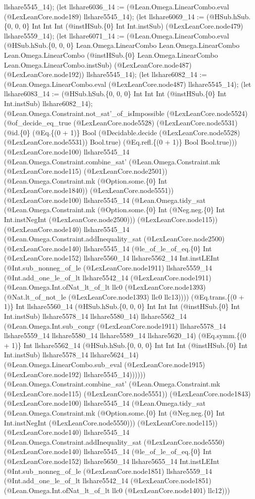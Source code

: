 \documentclass[11pt]{article}
\begin{document}
llshare5545\_14); (let llshare6036\_14 := (@Lean.Omega.LinearCombo.eval (@LexLeanCore.node189) llshare5545\_14); (let llshare6069\_14 := (@HSub.hSub.\{0, 0, 0\} Int Int Int (@instHSub.\{0\} Int Int.instSub) (@LexLeanCore.node479) llshare5559\_14); (let llshare6071\_14 := (@Lean.Omega.LinearCombo.eval (@HSub.hSub.\{0, 0, 0\} Lean.Omega.LinearCombo Lean.Omega.LinearCombo Lean.Omega.LinearCombo (@instHSub.\{0\} Lean.Omega.LinearCombo Lean.Omega.LinearCombo.instSub) (@LexLeanCore.node487) (@LexLeanCore.node192)) llshare5545\_14); (let llshare6082\_14 := (@Lean.Omega.LinearCombo.eval (@LexLeanCore.node487) llshare5545\_14); (let llshare6083\_14 := (@HSub.hSub.\{0, 0, 0\} Int Int Int (@instHSub.\{0\} Int Int.instSub) llshare6082\_14); (@Lean.Omega.Constraint.not\_sat'\_of\_isImpossible (@LexLeanCore.node5524) (@of\_decide\_eq\_true (@LexLeanCore.node5528) (@LexLeanCore.node5531) (@id.\{0\} (@Eq.\{(0 + 1)\} Bool (@Decidable.decide (@LexLeanCore.node5528) (@LexLeanCore.node5531)) Bool.true) (@Eq.refl.\{(0 + 1)\} Bool Bool.true))) (@LexLeanCore.node100) llshare5545\_14 (@Lean.Omega.Constraint.combine\_sat' (@Lean.Omega.Constraint.mk (@LexLeanCore.node115) (@LexLeanCore.node2501)) (@Lean.Omega.Constraint.mk (@Option.some.\{0\} Int (@LexLeanCore.node1840)) (@LexLeanCore.node5551)) (@LexLeanCore.node100) llshare5545\_14 (@Lean.Omega.tidy\_sat (@Lean.Omega.Constraint.mk (@Option.some.\{0\} Int (@Neg.neg.\{0\} Int Int.instNegInt (@LexLeanCore.node2500))) (@LexLeanCore.node115)) (@LexLeanCore.node140) llshare5545\_14 (@Lean.Omega.Constraint.addInequality\_sat (@LexLeanCore.node2500) (@LexLeanCore.node140) llshare5545\_14 (@le\_of\_le\_of\_eq.\{0\} Int (@LexLeanCore.node152) llshare5560\_14 llshare5562\_14 Int.instLEInt (@Int.sub\_nonneg\_of\_le (@LexLeanCore.node1911) llshare5559\_14 (@Int.add\_one\_le\_of\_lt llshare5542\_14 (@LexLeanCore.node1911) (@Lean.Omega.Int.ofNat\_lt\_of\_lt llc0 (@LexLeanCore.node1393) (@Nat.lt\_of\_not\_le (@LexLeanCore.node1393) llc0 llc13)))) (@Eq.trans.\{(0 + 1)\} Int llshare5560\_14 (@HSub.hSub.\{0, 0, 0\} Int Int Int (@instHSub.\{0\} Int Int.instSub) llshare5578\_14 llshare5580\_14) llshare5562\_14 (@Lean.Omega.Int.sub\_congr (@LexLeanCore.node1911) llshare5578\_14 llshare5559\_14 llshare5580\_14 llshare5589\_14 llshare5620\_14) (@Eq.symm.\{(0 + 1)\} Int llshare5562\_14 (@HSub.hSub.\{0, 0, 0\} Int Int Int (@instHSub.\{0\} Int Int.instSub) llshare5578\_14 llshare5624\_14) (@Lean.Omega.LinearCombo.sub\_eval (@LexLeanCore.node1915) (@LexLeanCore.node192) llshare5545\_14)))))) (@Lean.Omega.Constraint.combine\_sat' (@Lean.Omega.Constraint.mk (@LexLeanCore.node115) (@LexLeanCore.node5551)) (@LexLeanCore.node1843) (@LexLeanCore.node100) llshare5545\_14 (@Lean.Omega.tidy\_sat (@Lean.Omega.Constraint.mk (@Option.some.\{0\} Int (@Neg.neg.\{0\} Int Int.instNegInt (@LexLeanCore.node5550))) (@LexLeanCore.node115)) (@LexLeanCore.node140) llshare5545\_14 (@Lean.Omega.Constraint.addInequality\_sat (@LexLeanCore.node5550) (@LexLeanCore.node140) llshare5545\_14 (@le\_of\_le\_of\_eq.\{0\} Int (@LexLeanCore.node152) llshare5650\_14 llshare5655\_14 Int.instLEInt (@Int.sub\_nonneg\_of\_le (@LexLeanCore.node1851) llshare5559\_14 (@Int.add\_one\_le\_of\_lt llshare5542\_14 (@LexLeanCore.node1851) (@Lean.Omega.Int.ofNat\_lt\_of\_lt llc0 (@LexLeanCore.node1401) llc12))) 
\end{document}
